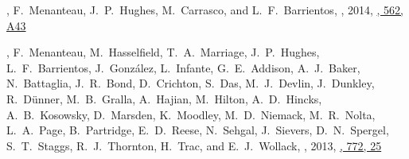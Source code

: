 \item
\myself, F.~Menanteau, J.~P.~Hughes, M.~Carrasco, and L.~F.~Barrientos,
,
2014, \href{https://ui.adsabs.harvard.edu/abs/2014A&A...562A..43S}{\aap, 562, A43}

\item
\myself, F.~Menanteau, M.~Hasselfield, T.~A.~Marriage, J.~P.~Hughes, L.~F.~Barrientos, J.~González, L.~Infante, G.~E.~Addison, A.~J.~Baker, N.~Battaglia, J.~R.~Bond, D.~Crichton, S.~Das, M.~J.~Devlin, J.~Dunkley, R.~Dünner, M.~B.~Gralla, A.~Hajian, M.~Hilton, A.~D.~Hincks, A.~B.~Kosowsky, D.~Marsden, K.~Moodley, M.~D.~Niemack, M.~R.~Nolta, L.~A.~Page, B.~Partridge, E.~D.~Reese, N.~Sehgal, J.~Sievers, D.~N.~Spergel, S.~T.~Staggs, R.~J.~Thornton, H.~Trac, and E.~J.~Wollack,
,
2013, \href{https://ui.adsabs.harvard.edu/abs/2013ApJ...772...25S}{\apj, 772, 25}

